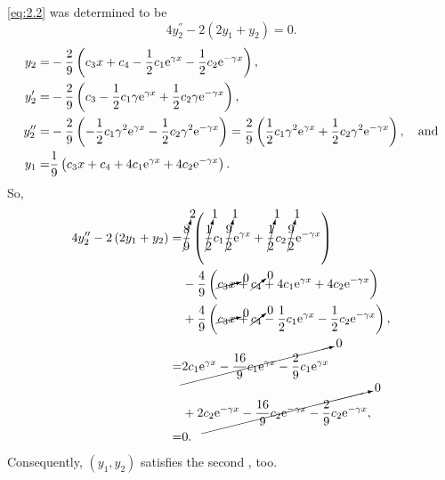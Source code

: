 \el \eqref{eq:2.2} was determined to be
\[
	4y_2^\dprime - 2\left(2y_1+y_2\right) = 0.
\]
\begin{align*}
	y_2 =& -\2o9\left(c_3x + c_4 -\half c_1 \egx -\half c_2 \engx\right), \\
	y_2^\prime =& -\2o9\left(c_3 -\half c_1\gamma\egx + \half c_2 \gamma\engx\right), \\
	y_2^\dprime =& -\2o9\left(-\half c_1\gamma^2 \egx - \half c_2 \gamma^2\engx \right) = \2o9\left(\half c_1\gamma^2 \egx + \half c_2 \gamma^2\engx \right),\quad\textrm{and}\\
	y_1 =& \1o9\left(c_3x + c_4 + 4c_1\egx + 4c_2\engx\right).
\end{align*}
So,
\begin{align*}
	4y_2^\dprime - 2\left(2y_1 + y_2\right) =& \cancelto{2}{\8o9}\left(\cancelto{1}{\half} c_1\cancelto{1}{\9o2}\egx + \cancelto{1}{\half} c_2\cancelto{1}{\9o2}\engx\right)\\
	{}& - \4o9\left(\cancelto{0}{c_3x} + \cancelto{0}{c_4} + 4c_1\egx + 4c_2\engx \right)\\
	{}& + \4o9\left(\cancelto{0}{c_3x} + \cancelto{0}{c_4} -\half c_1\egx -\half c_2\engx \right),\\
	=& \cancelto{0}{2c_1\egx - \frac{16}{9}c_1\egx - \2o9 c_1 \egx}\\
	{}& + 2\cancelto{0}{c_2\engx -\frac{16}{9}c_2\engx - \2o9 c_2\engx},\\
	=& 0.
\end{align*}
Consequently, $\left(y_1,y_2\right)$ satisfies the second \el, too.